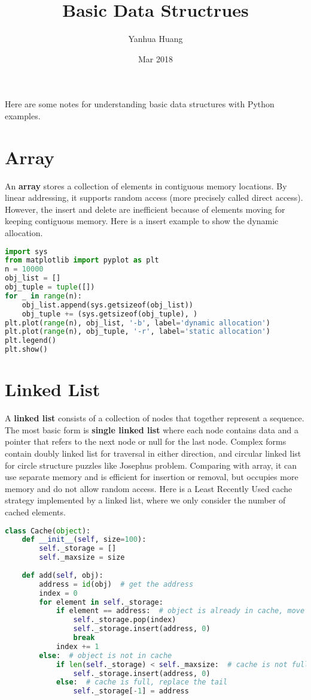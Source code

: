 \documentclass[a4paper,11pt]{article}
\begin{document}
\title{Basic Data Structrues}
\author{Yanhua Huang}
\date{Mar 2018}
\maketitle

Here are some notes for understanding basic data structures with Python examples.


\section*{Array}

An \textbf{array} stores a collection of elements in contiguous memory locations. 
By linear addressing, it supports random access (more precisely called direct access).
However, the insert and delete are inefficient because of elements moving for keeping contiguous memory.
Here is a insert example to show the dynamic allocation.
\begin{lstlisting}[language=Python]
import sys
from matplotlib import pyplot as plt
n = 10000
obj_list = []
obj_tuple = tuple([])
for _ in range(n):
    obj_list.append(sys.getsizeof(obj_list))
    obj_tuple += (sys.getsizeof(obj_tuple), )
plt.plot(range(n), obj_list, '-b', label='dynamic allocation')
plt.plot(range(n), obj_tuple, '-r', label='static allocation')
plt.legend()
plt.show()
\end{lstlisting}


\section*{Linked List}

A \textbf{linked list} consists of a collection of nodes that together represent a sequence. 
The most basic form is \textbf{single linked list} where each node contains data and a pointer that refers to the next node or null for the last node.
Complex forms contain doubly linked list for traversal in either direction, and circular linked list for circle structure puzzles like Josephus problem.
Comparing with array, it can use separate memory and is efficient for insertion or removal, but occupies more memory and do not allow random access.
Here is a Least Recently Used cache strategy implemented by a linked list, where we only consider the number of cached elements.
\begin{lstlisting}[language=Python]
class Cache(object):
    def __init__(self, size=100):
        self._storage = []
        self._maxsize = size
    
    def add(self, obj):
        address = id(obj)  # get the address
        index = 0
        for element in self._storage:
            if element == address:  # object is already in cache, move to the head
                self._storage.pop(index)
                self._storage.insert(address, 0)
                break
            index += 1
        else:  # object is not in cache
            if len(self._storage) < self._maxsize:  # cache is not full, insert to the head
                self._storage.insert(address, 0)
            else:  # cache is full, replace the tail
                self._storage[-1] = address
\end{lstlisting}
\end{document}

